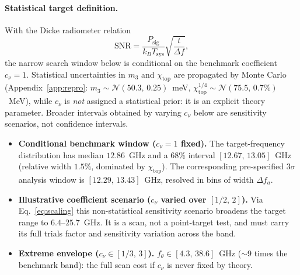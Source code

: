 \documentclass[11pt,a4paper]{article}
\begin{document}
\paragraph{Statistical target definition.} With the Dicke radiometer relation
\begin{equation}
\mathrm{SNR} = \frac{P_{\mathrm{sig}}}{k_B T_{\mathrm{sys}}}
\sqrt{\frac{t}{\Delta f}},
\end{equation}
the narrow search window below is conditional on the benchmark coefficient
$c_\nu = 1$. Statistical uncertainties in $m_3$ and $\chi_{\mathrm{top}}$
are propagated by Monte Carlo (Appendix~\ref{app:repro}: $m_3 \sim
\mathcal{N}(50.3,\,0.25)$~meV, $\chi_{\mathrm{top}}^{1/4} \sim
\mathcal{N}(75.5,\,0.7\%)$~MeV), while $c_\nu$ is \emph{not} assigned a
statistical prior: it is an explicit theory parameter. Broader intervals
obtained by varying $c_\nu$ below are sensitivity scenarios, not confidence
intervals.
\begin{itemize}
\item \textbf{Conditional benchmark window ($c_\nu = 1$ fixed).} The
target-frequency distribution has median $12.86$~GHz and a 68\% interval
$[12.67,\,13.05]$~GHz (relative width $1.5\%$, dominated by
$\chi_{\mathrm{top}}$). The corresponding pre-specified $3\sigma$ analysis
window is $[12.29,\,13.43]$~GHz, resolved in bins of width $\Delta f_a$.
\item \textbf{Illustrative coefficient scenario ($c_\nu$ varied over
$[1/2,\,2]$).} Via Eq.~\eqref{eq:scaling} this non-statistical sensitivity
scenario broadens the target range to $6.4$--$25.7$~GHz. It is a scan, not a
point-target test, and must carry its full trials factor and sensitivity
variation across the band.
\item \textbf{Extreme envelope ($c_\nu \in [1/3,\,3]$).} $f_\theta \in
[4.3,\,38.6]$~GHz ($\sim$9 times the benchmark band): the full scan cost if
$c_\nu$ is never fixed by theory.
\end{itemize}
\end{document}
